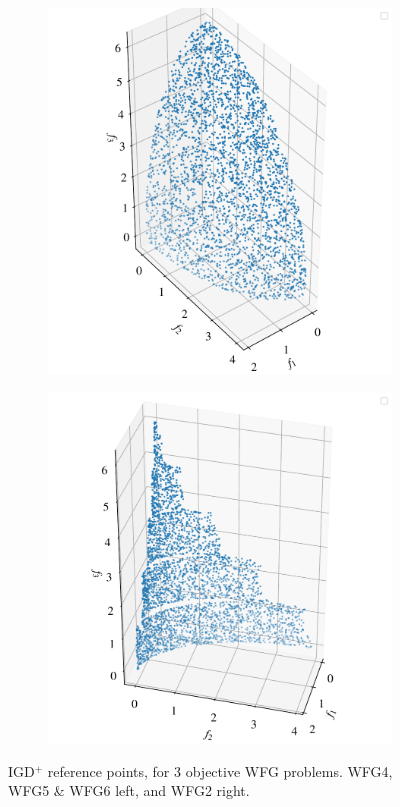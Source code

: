 \documentclass[conference]{IEEEtran}
\newcommand\igd{IGD$^+$\xspace}
\begin{document}
\begin{figure}[t]
\begin{subfigure}[t]{0.45\columnwidth}
    \includegraphics[width=\columnwidth]{figures/_IGD_refpoint_example_WFG4.pdf}
\end{subfigure}
\begin{subfigure}[t]{0.45\columnwidth}
    \includegraphics[width=\columnwidth]{figures/_IGD_refpoint_example_WFG2.pdf}
\end{subfigure}
\caption{\igd reference points, for 3 objective WFG problems. WFG4, WFG5 \& WFG6 left, and WFG2 right. }
\label{fig: refpoints}

\end{figure}
\end{document}
